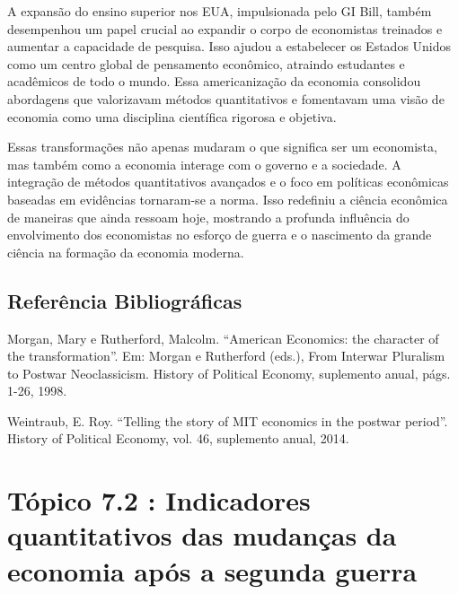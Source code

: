 \documentclass[a4paper,12pt]{article}[abntex2]
\begin{document}
A expansão do ensino superior nos EUA, impulsionada pelo GI Bill, também desempenhou um papel crucial ao expandir o corpo de economistas treinados e aumentar a capacidade de pesquisa. Isso ajudou a estabelecer os Estados Unidos como um centro global de pensamento econômico, atraindo estudantes e acadêmicos de todo o mundo. Essa americanização da economia consolidou abordagens que valorizavam métodos quantitativos e fomentavam uma visão de economia como uma disciplina científica rigorosa e objetiva.

Essas transformações não apenas mudaram o que significa ser um economista, mas também como a economia interage com o governo e a sociedade. A integração de métodos quantitativos avançados e o foco em políticas econômicas baseadas em evidências tornaram-se a norma. Isso redefiniu a ciência econômica de maneiras que ainda ressoam hoje, mostrando a profunda influência do envolvimento dos economistas no esforço de guerra e o nascimento da grande ciência na formação da economia moderna.

\subsection{\textbf{Referência Bibliográficas}}
Morgan, Mary e Rutherford, Malcolm. “American Economics: the character of the transformation”.
Em: Morgan e Rutherford (eds.), From Interwar Pluralism to Postwar Neoclassicism.
History of Political Economy, suplemento anual, págs. 1-26, 1998.

Weintraub, E. Roy. “Telling the story of MIT economics in the postwar period”. History of
Political Economy, vol. 46, suplemento anual, 2014.

\newpage
\section{\textbf{Tópico 7.2 : Indicadores quantitativos das mudanças da economia após a segunda guerra}}
\end{document}
